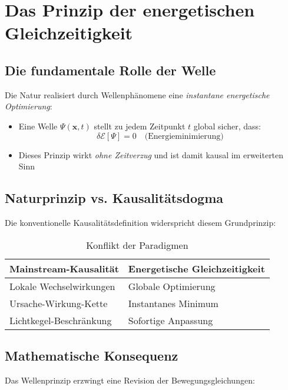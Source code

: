\section{Das Prinzip der energetischen Gleichzeitigkeit}
\label{sec:energetische_gleichzeitigkeit}

\subsection{Die fundamentale Rolle der Welle}
Die Natur realisiert durch Wellenphänomene eine \emph{instantane energetische Optimierung}:

\begin{itemize}
    \item Eine Welle $\Psi(\mathbf{x},t)$ stellt zu jedem Zeitpunkt $t$ global sicher, dass:
    \begin{equation}
        \delta \mathcal{E}[\Psi] = 0 \quad \text{(Energieminimierung)}
    \end{equation}
    
    \item Dieses Prinzip wirkt \emph{ohne Zeitverzug} und ist damit kausal im erweiterten Sinn
\end{itemize}

\subsection{Naturprinzip vs. Kausalitätsdogma}
Die konventionelle Kausalitätsdefinition widerspricht diesem Grundprinzip:

\begin{table}[ht]
    \centering
    \begin{tabular}{ll}
        \toprule
        \textbf{Mainstream-Kausalität} & \textbf{Energetische Gleichzeitigkeit} \\
        \midrule
        Lokale Wechselwirkungen & Globale Optimierung \\
        Ursache-Wirkung-Kette & Instantanes Minimum \\
        Lichtkegel-Beschränkung & Sofortige Anpassung \\
        \bottomrule
    \end{tabular}
    \caption{Konflikt der Paradigmen}
\end{table}

\subsection{Mathematische Konsequenz}
Das Wellenprinzip erzwingt eine Revision der Bewegungsgleichungen:

